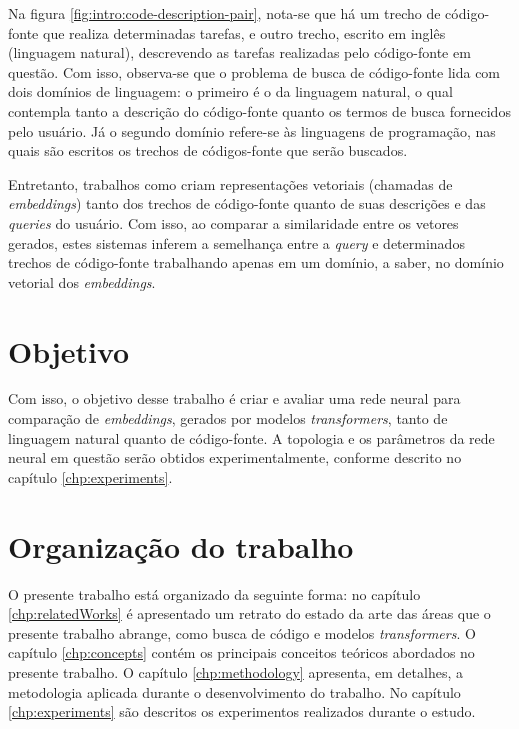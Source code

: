 Na figura \ref{fig:intro:code-description-pair}, nota-se que há um trecho de código-fonte que realiza determinadas tarefas, e outro trecho, escrito em inglês (linguagem natural), descrevendo as tarefas realizadas pelo código-fonte em questão. Com isso, observa-se que o problema de busca de código-fonte lida com dois domínios de linguagem: o primeiro é o da linguagem natural, o qual contempla tanto a descrição do código-fonte quanto os termos de busca fornecidos pelo usuário. Já o segundo domínio refere-se às linguagens de programação, nas quais são escritos os trechos de códigos-fonte que serão buscados.

Entretanto, trabalhos como \cite{Gu2018DeepCS} criam representações vetoriais (chamadas de \textit{embeddings}) tanto dos trechos de código-fonte quanto de suas descrições e das \textit{queries} do usuário. Com isso, ao comparar a similaridade entre os vetores gerados, estes sistemas inferem a semelhança entre a \textit{query} e determinados trechos de código-fonte trabalhando apenas em um domínio, a saber, no domínio vetorial dos \textit{embeddings}.

\section{Objetivo}
Com isso, o objetivo desse trabalho é criar e avaliar uma rede neural para comparação de \textit{embeddings}, gerados por modelos \textit{transformers}, tanto de linguagem natural quanto de código-fonte. A topologia e os parâmetros da rede neural em questão serão obtidos experimentalmente, conforme descrito no capítulo \ref{chp:experiments}.

\section{Organização do trabalho}
O presente trabalho está organizado da seguinte forma: no capítulo \ref{chp:relatedWorks} é apresentado um retrato do estado da arte das áreas que o presente trabalho abrange, como busca de código e modelos \textit{transformers}. O capítulo \ref{chp:concepts} contém os principais conceitos teóricos abordados no presente trabalho. O capítulo \ref{chp:methodology} apresenta, em detalhes, a metodologia aplicada durante o desenvolvimento do trabalho. No capítulo \ref{chp:experiments} são descritos os experimentos realizados durante o estudo.
